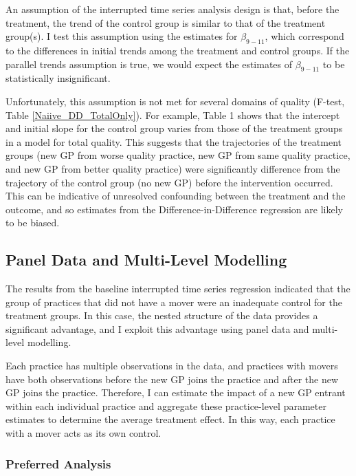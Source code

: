 \documentclass[11pt]{article}
\begin{document}
An assumption of the interrupted time series analysis design is that, before the treatment, the trend of the control group is similar to that of the treatment group(s). I test this assumption using the estimates for $\beta_{9-11}$, which correspond to the differences in initial trends among the treatment and control groups. If the parallel trends assumption is true, we would expect the estimates of $\beta_{9-11}$ to be statistically insignificant.

Unfortunately, this assumption is not met for several domains of quality (F-test, Table \ref{Naiive_DD_TotalOnly}). For example, Table 1 shows that the intercept and initial slope for the control group varies from those of the treatment groups in a model for total quality. This suggests that the trajectories of the treatment groups (new GP from worse quality practice, new GP from same quality practice, and new GP from better quality practice) were significantly difference from the trajectory of the control group (no new GP) before the intervention occurred. This can be indicative of unresolved confounding between the treatment and the outcome, and so estimates from the Difference-in-Difference regression are likely to be biased.



\subsection{Panel Data and Multi-Level Modelling}

The results from the baseline interrupted time series regression indicated that the group of practices that did not have a mover were an inadequate control for the treatment groups. In this case, the nested structure of the data provides a significant advantage, and I exploit this advantage using panel data and multi-level modelling.

Each practice has multiple observations in the data, and practices with movers have both observations before the new GP joins the practice and after the new GP joins the practice. Therefore, I can estimate the impact of a new GP entrant within each individual practice and aggregate these practice-level parameter estimates to determine the average treatment effect. In this way, each practice with a mover acts as its own control.

\subsubsection{Preferred Analysis}
\end{document}
